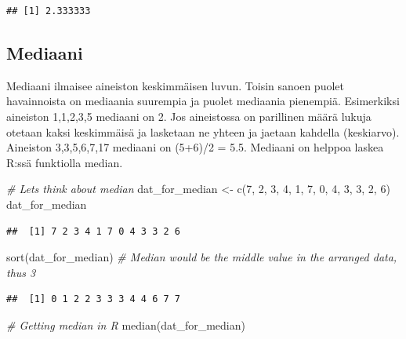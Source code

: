 \documentclass[
]{book}
\newenvironment{Shaded}{\begin{snugshade}}{\end{snugshade}}
\newcommand{\CommentTok}[1]{\textcolor[rgb]{0.56,0.35,0.01}{\textit{#1}}}
\newcommand{\DecValTok}[1]{\textcolor[rgb]{0.00,0.00,0.81}{#1}}
\newcommand{\FunctionTok}[1]{\textcolor[rgb]{0.00,0.00,0.00}{#1}}
\newcommand{\NormalTok}[1]{#1}
\newcommand{\OtherTok}[1]{\textcolor[rgb]{0.56,0.35,0.01}{#1}}
\begin{document}
\begin{verbatim}
## [1] 2.333333
\end{verbatim}

\hypertarget{mediaani}{%
\subsection{Mediaani}\label{mediaani}}

Mediaani ilmaisee aineiston keskimmäisen luvun. Toisin sanoen puolet havainnoista on mediaania suurempia ja puolet mediaania pienempiä. Esimerkiksi aineiston 1,1,2,3,5 mediaani on 2. Jos aineistossa on parillinen määrä lukuja otetaan kaksi keskimmäisä ja lasketaan ne yhteen ja jaetaan kahdella (keskiarvo). Aineiston 3,3,5,6,7,17 mediaani on (5+6)/2 = 5.5. Mediaani on helppoa laskea R:ssä funktiolla median.

\begin{Shaded}
\begin{Highlighting}[]
\CommentTok{\# Let\textquotesingle{}s think about median}
\NormalTok{dat\_for\_median }\OtherTok{\textless{}{-}} \FunctionTok{c}\NormalTok{(}\DecValTok{7}\NormalTok{, }\DecValTok{2}\NormalTok{, }\DecValTok{3}\NormalTok{, }\DecValTok{4}\NormalTok{, }\DecValTok{1}\NormalTok{, }\DecValTok{7}\NormalTok{, }\DecValTok{0}\NormalTok{, }\DecValTok{4}\NormalTok{, }\DecValTok{3}\NormalTok{, }\DecValTok{3}\NormalTok{, }\DecValTok{2}\NormalTok{, }\DecValTok{6}\NormalTok{)}
\NormalTok{dat\_for\_median}
\end{Highlighting}
\end{Shaded}

\begin{verbatim}
##  [1] 7 2 3 4 1 7 0 4 3 3 2 6
\end{verbatim}

\begin{Shaded}
\begin{Highlighting}[]
\FunctionTok{sort}\NormalTok{(dat\_for\_median) }\CommentTok{\# Median would be the middle value in the arranged data, thus 3}
\end{Highlighting}
\end{Shaded}

\begin{verbatim}
##  [1] 0 1 2 2 3 3 3 4 4 6 7 7
\end{verbatim}

\begin{Shaded}
\begin{Highlighting}[]
\CommentTok{\# Getting median in R}
\FunctionTok{median}\NormalTok{(dat\_for\_median)}
\end{Highlighting}
\end{Shaded}
\end{document}
